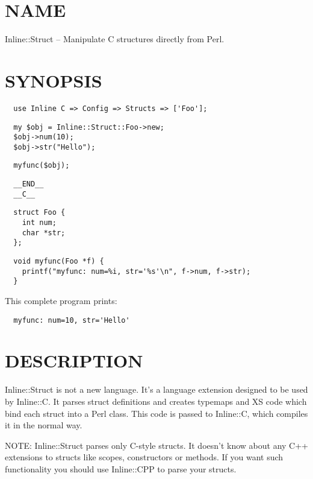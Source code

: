 \documentclass{article}
\begin{document}
\tableofcontents

\section{NAME\label{NAME}}


Inline::Struct -- Manipulate C structures directly from Perl.

\section{SYNOPSIS\label{SYNOPSIS}}
\begin{verbatim}
  use Inline C => Config => Structs => ['Foo'];
\end{verbatim}
\begin{verbatim}
  my $obj = Inline::Struct::Foo->new;
  $obj->num(10);
  $obj->str("Hello");
\end{verbatim}
\begin{verbatim}
  myfunc($obj);
\end{verbatim}
\begin{verbatim}
  __END__
  __C__
\end{verbatim}
\begin{verbatim}
  struct Foo {
    int num;
    char *str;
  };
\end{verbatim}
\begin{verbatim}
  void myfunc(Foo *f) {
    printf("myfunc: num=%i, str='%s'\n", f->num, f->str);
  }
\end{verbatim}


This complete program prints:

\begin{verbatim}
  myfunc: num=10, str='Hello'
\end{verbatim}
\section{DESCRIPTION\label{DESCRIPTION}}


Inline::Struct is not a new language. It's a language extension designed to 
be used by Inline::C. It parses struct definitions and creates
typemaps and XS code which bind each struct into a Perl class. This code is
passed to Inline::C, which compiles it in the normal way.



NOTE: Inline::Struct parses only C-style structs. It doesn't know about any
C++ extensions to structs like scopes, constructors or methods. If you want
such functionality you should use Inline::CPP to parse your structs.
\end{document}
